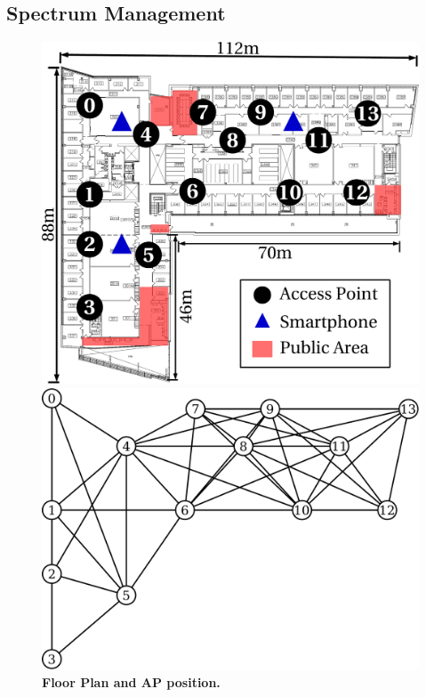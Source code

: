 \subsection{Spectrum Management}
\label{subsec:channel}

\begin{figure}[t]
  \centering
  \begin{minipage}[t]{0.31\textwidth}
    \includegraphics[width=\columnwidth]{./figures/davis_floor_plan.pdf}
    \caption{\textbf{Floor Plan and AP position.}}
    \label{fig:floor}
  \end{minipage}\hspace{0.01\textwidth}%
  \begin{minipage}[t]{0.33\textwidth}
    \includegraphics[width=\textwidth]{./figures/DavisConflictGraphSeparate-AP.pdf}

\end{minipage}
\end{figure}
